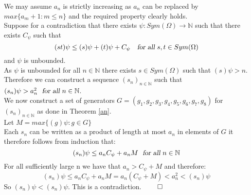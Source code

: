 \documentclass{report}
\begin{document}
We may assume $a_n$ is strictly increasing as $a_n$ can be replaced by $max\{a_m + 1:m \leq n\}$ and the required property clearly holds.\\
Suppose for a contradiction that there exists $\psi: Sym(\Omega) \rightarrow \mathbb{N}$ such that there exists $C_\psi$ such that $$(st)\psi \leq (s)\psi + (t)\psi + C_\psi\ \ \textsl{ for all } s,t \in Sym(\Omega)$$ and $\psi$ is unbounded.\\
As $\psi$ is unbounded for all $n\in \mathbb{N}$ there exists $s \in Sym(\Omega)$ such that $(s)\psi > n$.\\
Therefore we can construct a sequence $(s_n)_{n \in \mathbb{N}}$ such that $(s_n)\psi > a_n^2\ \textsl{ for all } n \in \mathbb{N}$.\\
We now construct a set of generators $G=(g_1,g_2,g_3,g_4,g_5,g_6,g_7,g_8)$ for $(s_n)_{n \in \mathbb{N}}$ as done in Theorem \ref{an}.\\
Let $M = max\{(g)\psi: g \in G \}$\\
Each $s_n$ can be written as a product of length at most $a_n$ in elements of $G$ it therefore follows from induction that: $$(s_n)\psi \leq a_nC_\psi + a_nM \ \textsl{ for all } n \in \mathbb{N}$$
For all sufficiently large n we have that $a_n>C_\psi + M$ and therefore: $$(s_n)\psi \leq a_nC_\psi + a_nM=a_n(C_\psi + M)< a_n^{2} < (s_n)\psi$$
So $(s_n)\psi < (s_n)\psi$. This is a contradiction. $\qed$
\end{document}
